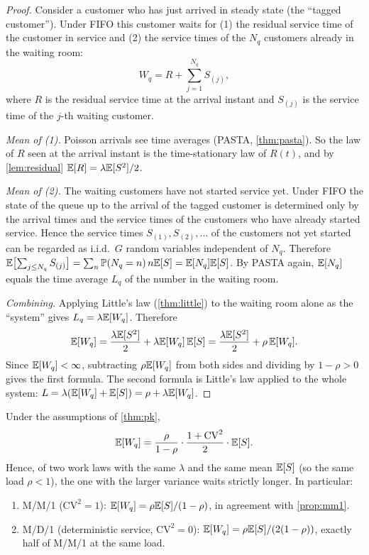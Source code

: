 \begin{proof}
Consider a customer who has just arrived in steady state (the ``tagged
customer''). Under FIFO this customer waits for (1) the residual service time of
the customer in service and (2) the service times of the $N_q$ customers already
in the waiting room:
\[
  W_q=R+\sum_{j=1}^{N_q}S_{(j)},
\]
where $R$ is the residual service time at the arrival instant and $S_{(j)}$ is the
service time of the $j$-th waiting customer.

\emph{Mean of (1).} Poisson arrivals see time averages (PASTA, \cref{thm:pasta}).
So the law of $R$ seen at the arrival instant is the time-stationary law of
$R(t)$, and by \cref{lem:residual} $\mathbb{E}[R]=\lambda\mathbb{E}[S^2]/2$.

\emph{Mean of (2).} The waiting customers have not started service yet. Under
FIFO the state of the queue up to the arrival of the tagged customer is
determined only by the arrival times and the service times of the customers who
have already started service. Hence the service times $S_{(1)},S_{(2)},\dots$ of
the customers not yet started can be regarded as i.i.d.\ $G$ random variables
independent of $N_q$. Therefore
$\mathbb{E}\bigl[\sum_{j\le N_q}S_{(j)}\bigr]=\sum_{n}\mathbb{P}(N_q=n)\,n\mathbb{E}[S]=\mathbb{E}[N_q]\mathbb{E}[S]$.
By PASTA again, $\mathbb{E}[N_q]$ equals the time average $L_q$ of the number in the
waiting room.

\emph{Combining.} Applying Little's law (\cref{thm:little}) to the waiting room
alone as the ``system'' gives $L_q=\lambda\mathbb{E}[W_q]$. Therefore
\[
  \mathbb{E}[W_q]=\frac{\lambda\mathbb{E}[S^2]}{2}+\lambda\mathbb{E}[W_q]\,\mathbb{E}[S]
  =\frac{\lambda\mathbb{E}[S^2]}{2}+\rho\,\mathbb{E}[W_q].
\]
Since $\mathbb{E}[W_q]<\infty$, subtracting $\rho\mathbb{E}[W_q]$ from both sides and dividing by
$1-\rho>0$ gives the first formula. The second formula is Little's law applied to
the whole system: $L=\lambda(\mathbb{E}[W_q]+\mathbb{E}[S])=\rho+\lambda\mathbb{E}[W_q]$.
\end{proof}

\begin{corollary}\label{cor:variance}
Under the assumptions of \cref{thm:pk},
\begin{equation}\label{L3:eq:pk-cv}
  \mathbb{E}[W_q]=\frac{\rho}{1-\rho}\cdot\frac{1+\mathrm{CV}^2}{2}\cdot\mathbb{E}[S].
\end{equation}
Hence, of two work laws with the same $\lambda$ and the same mean $\mathbb{E}[S]$ (so the
same load $\rho<1$), the one with the larger variance waits strictly longer. In
particular:
\begin{enumerate}[label=(\roman*)]
\item M/M/1 ($\mathrm{CV}^2=1$): $\mathbb{E}[W_q]=\rho\mathbb{E}[S]/(1-\rho)$, in agreement with
  \cref{prop:mm1}.
\item M/D/1 (deterministic service, $\mathrm{CV}^2=0$):
  $\mathbb{E}[W_q]=\rho\mathbb{E}[S]/(2(1-\rho))$, exactly half of M/M/1 at the same load.
\end{enumerate}
\end{corollary}


